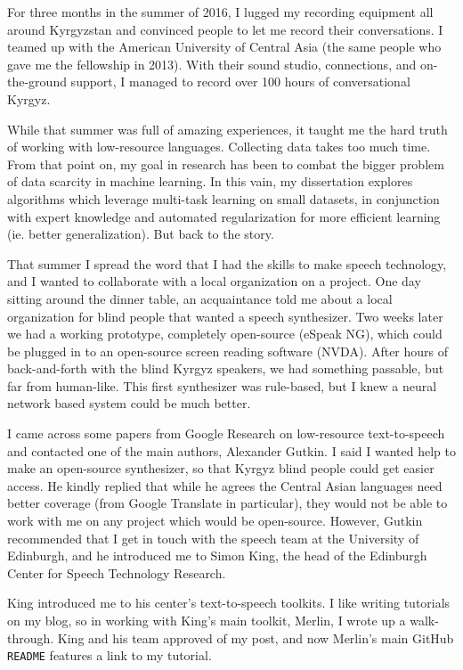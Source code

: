 \documentclass[12pt,a4paper]{article}
\begin{document}
For three months in the summer of 2016, I lugged my recording equipment all around Kyrgyzstan and convinced people to let me record their conversations. I teamed up with the American University of Central Asia (the same people who gave me the fellowship in 2013). With their sound studio, connections, and on-the-ground support, I managed to record over 100 hours of conversational Kyrgyz.

While that summer was full of amazing experiences, it taught me the hard truth of working with low-resource languages. Collecting data takes too much time. From that point on, my goal in research has been to combat the bigger problem of data scarcity in machine learning. In this vain, my dissertation explores algorithms which leverage multi-task learning on small datasets, in conjunction with expert knowledge and automated regularization for more efficient learning (ie. better generalization). But back to the story. 

That summer I spread the word that I had the skills to make speech technology, and I wanted to collaborate with a local organization on a project. One day sitting around the dinner table, an acquaintance told me about a local organization for blind people that wanted a speech synthesizer. Two weeks later we had a working prototype, completely open-source (eSpeak NG), which could be plugged in to an open-source screen reading software (NVDA). After hours of back-and-forth with the blind Kyrgyz speakers, we had something passable, but far from human-like. This first synthesizer was rule-based, but I knew a neural network based system could be much better.

I came across some papers from Google Research on low-resource text-to-speech and contacted one of the main authors, Alexander Gutkin. I said I wanted help to make an open-source synthesizer, so that Kyrgyz blind people could get easier access. He kindly replied that while he agrees the Central Asian languages need better coverage (from Google Translate in particular), they would not be able to work with me on any project which would be open-source. However, Gutkin recommended that I get in touch with the speech team at the University of Edinburgh, and he introduced me to Simon King, the head of the Edinburgh Center for Speech Technology Research.

King introduced me to his center's text-to-speech toolkits. I like writing tutorials on my blog, so in working with King's main toolkit, Merlin, I wrote up a walk-through. King and his team approved of my post, and now Merlin's main GitHub \texttt{README} features a link to my tutorial.
\end{document}
